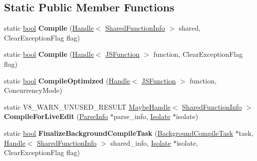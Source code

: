 \subsection*{Static Public Member Functions}
\begin{DoxyCompactItemize}
\item 
\mbox{\label{classv8_1_1internal_1_1Compiler_aff8ad726e6e98d3ac5f694920f5b67e3}} 
static \mbox{\hyperlink{classbool}{bool}} {\bfseries Compile} (\mbox{\hyperlink{classv8_1_1internal_1_1Handle}{Handle}}$<$ \mbox{\hyperlink{classv8_1_1internal_1_1SharedFunctionInfo}{Shared\+Function\+Info}} $>$ shared, Clear\+Exception\+Flag flag)
\item 
\mbox{\label{classv8_1_1internal_1_1Compiler_afbc8e9fe9de9febf48d6c71c79978671}} 
static \mbox{\hyperlink{classbool}{bool}} {\bfseries Compile} (\mbox{\hyperlink{classv8_1_1internal_1_1Handle}{Handle}}$<$ \mbox{\hyperlink{classv8_1_1internal_1_1JSFunction}{J\+S\+Function}} $>$ function, Clear\+Exception\+Flag flag)
\item 
\mbox{\label{classv8_1_1internal_1_1Compiler_ad629d712fc453a783d180175348eec1e}} 
static \mbox{\hyperlink{classbool}{bool}} {\bfseries Compile\+Optimized} (\mbox{\hyperlink{classv8_1_1internal_1_1Handle}{Handle}}$<$ \mbox{\hyperlink{classv8_1_1internal_1_1JSFunction}{J\+S\+Function}} $>$ function, Concurrency\+Mode)
\item 
\mbox{\label{classv8_1_1internal_1_1Compiler_accb339c331e8d14febeabddf6dcc4a32}} 
static V8\+\_\+\+W\+A\+R\+N\+\_\+\+U\+N\+U\+S\+E\+D\+\_\+\+R\+E\+S\+U\+LT \mbox{\hyperlink{classv8_1_1internal_1_1MaybeHandle}{Maybe\+Handle}}$<$ \mbox{\hyperlink{classv8_1_1internal_1_1SharedFunctionInfo}{Shared\+Function\+Info}} $>$ {\bfseries Compile\+For\+Live\+Edit} (\mbox{\hyperlink{classv8_1_1internal_1_1ParseInfo}{Parse\+Info}} $\ast$parse\+\_\+info, \mbox{\hyperlink{classv8_1_1internal_1_1Isolate}{Isolate}} $\ast$isolate)
\item 
\mbox{\label{classv8_1_1internal_1_1Compiler_ad4f7a1d1db39f21bac8c44e41cc85458}} 
static \mbox{\hyperlink{classbool}{bool}} {\bfseries Finalize\+Background\+Compile\+Task} (\mbox{\hyperlink{classv8_1_1internal_1_1BackgroundCompileTask}{Background\+Compile\+Task}} $\ast$task, \mbox{\hyperlink{classv8_1_1internal_1_1Handle}{Handle}}$<$ \mbox{\hyperlink{classv8_1_1internal_1_1SharedFunctionInfo}{Shared\+Function\+Info}} $>$ shared\+\_\+info, \mbox{\hyperlink{classv8_1_1internal_1_1Isolate}{Isolate}} $\ast$isolate, Clear\+Exception\+Flag flag)

\end{DoxyCompactItemize}
